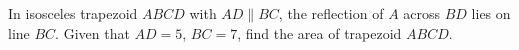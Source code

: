 In isosceles trapezoid $ABCD$ with $AD\parallel BC$, the reflection of $A$ across $BD$ lies on line $BC$. Given that $AD=5$, $BC=7$, find the area of trapezoid $ABCD$.

